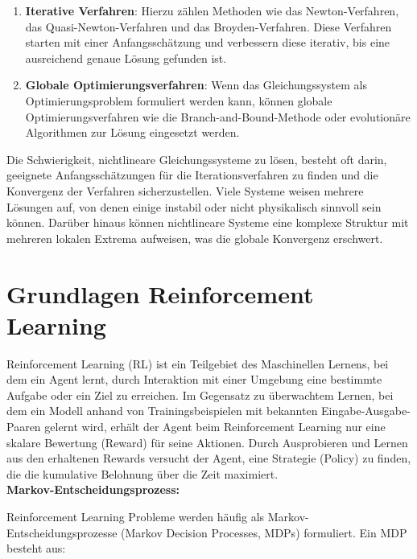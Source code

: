 \documentclass{article}
\theoremstyle{newline}
\begin{document}
\begin{onehalfspace}
\begin{enumerate}
	\item \textbf{Iterative Verfahren}: Hierzu zählen Methoden wie das Newton-Verfahren, das Quasi-Newton-Verfahren und das Broyden-Verfahren. Diese Verfahren starten mit einer Anfangsschätzung und verbessern diese iterativ, bis eine ausreichend genaue Lösung gefunden ist.
	
	\item \textbf{Globale Optimierungsverfahren}: Wenn das Gleichungssystem als Optimierungsproblem formuliert werden kann, können globale Optimierungsverfahren wie die Branch-and-Bound-Methode oder evolutionäre Algorithmen zur Lösung eingesetzt werden.
\end{enumerate}

Die Schwierigkeit, nichtlineare Gleichungssysteme zu lösen, besteht oft darin, geeignete Anfangsschätzungen für die Iterationsverfahren zu finden und die Konvergenz der Verfahren sicherzustellen. Viele Systeme weisen mehrere Lösungen auf, von denen einige instabil oder nicht physikalisch sinnvoll sein können. Darüber hinaus können nichtlineare Systeme eine komplexe Struktur mit mehreren lokalen Extrema aufweisen, was die globale Konvergenz erschwert. 


\section{Grundlagen Reinforcement Learning}

Reinforcement Learning (RL) ist ein Teilgebiet des Maschinellen Lernens, bei dem ein Agent lernt, durch Interaktion mit einer Umgebung eine bestimmte Aufgabe oder ein Ziel zu erreichen. Im Gegensatz zu überwachtem Lernen, bei dem ein Modell anhand von Trainingsbeispielen mit bekannten Eingabe-Ausgabe-Paaren gelernt wird, erhält der Agent beim Reinforcement Learning nur eine skalare Bewertung (Reward) für seine Aktionen. Durch Ausprobieren und Lernen aus den erhaltenen Rewards versucht der Agent, eine Strategie (Policy) zu finden, die die kumulative Belohnung über die Zeit maximiert.
\\

\textbf{Markov-Entscheidungsprozess:}
\smallskip

Reinforcement Learning Probleme werden häufig als Markov-Entscheidungsprozesse (Markov Decision Processes, MDPs) formuliert. Ein MDP besteht aus:


\end{onehalfspace}
\end{document}
